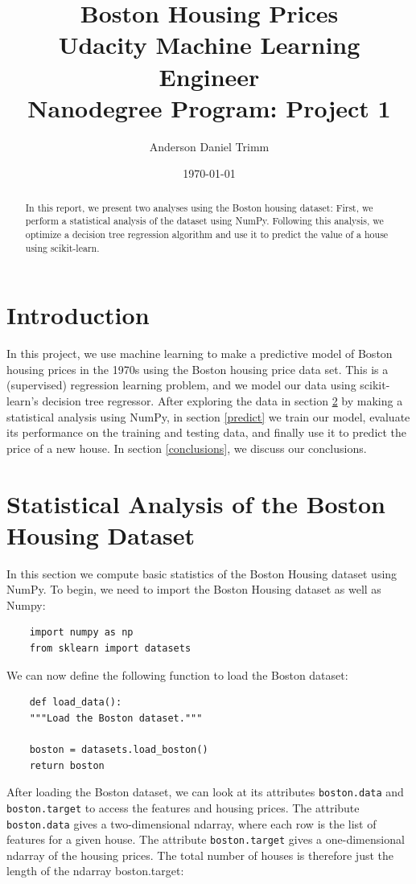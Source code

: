 \documentclass[12 pt]{article}
\numberwithin{equation}{section}
\begin{document}
\title{Boston Housing Prices \\ \footnotesize{Udacity Machine Learning Engineer \\ Nanodegree Program: Project 1}}
\author{Anderson Daniel Trimm}
\date{\today}
\maketitle
\begin{abstract}
In this report, we present two analyses using the Boston housing dataset: First, we perform a statistical analysis of the dataset using NumPy. Following this analysis, we optimize a decision tree regression algorithm and use it to predict the value of a house using scikit-learn. 
\end{abstract}
\section{Introduction}
In this project, we use machine learning to make a predictive model of Boston housing prices in the 1970s using the Boston housing price data set. This is a (supervised) regression learning problem, and we model our data using scikit-learn's decision tree regressor. After exploring the data in section \ref{stats} by making a statistical analysis using NumPy, in section \ref{predict} we train our model, evaluate its performance on the training and testing data, and finally use it to predict the price of a new house. In section \ref{conclusions}, we discuss our conclusions.
\section{Statistical Analysis of the Boston Housing Dataset}\label{stats}
In this section we compute basic statistics of the Boston Housing dataset using NumPy. To begin, we need to import the Boston Housing dataset as well as Numpy:

\begin{verbatim}
	import numpy as np
	from sklearn import datasets
\end{verbatim}

We can now define the following function to load the Boston dataset:

\begin{verbatim}
	def load_data():
    """Load the Boston dataset."""

    boston = datasets.load_boston()
    return boston
\end{verbatim}
After loading the Boston dataset, we can look at its attributes \texttt{boston.data} and \texttt{boston.target} to access the features and housing prices. The attribute \texttt{boston.data} gives a two-dimensional ndarray, where each row is the list of features for a given house. The attribute \texttt{boston.target} gives a one-dimensional ndarray of the housing prices. The total number of houses is therefore just the length of the ndarray boston.target:
\end{document}
